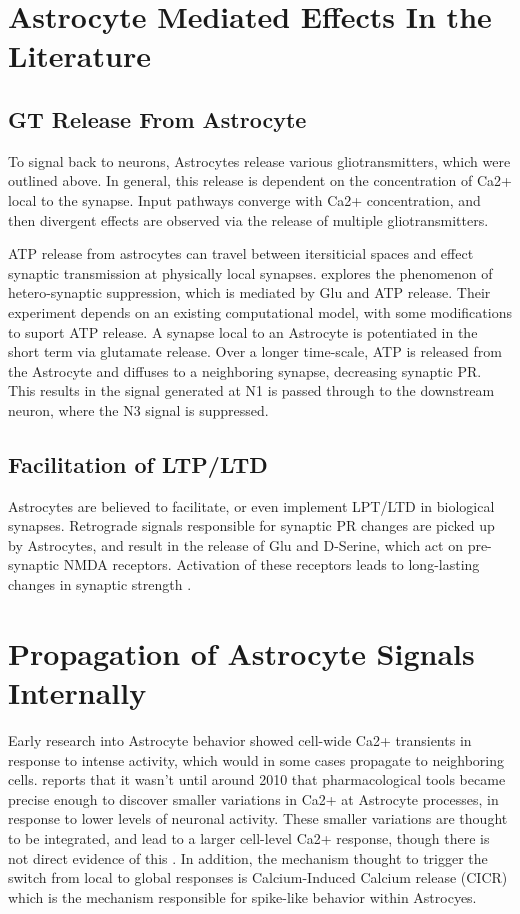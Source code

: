     \section{Astrocyte Mediated Effects In the Literature}
    \subsection{GT Release From Astrocyte}
    To signal back to neurons, Astrocytes release various gliotransmitters,
    which were outlined above. In general, this release is dependent on the
    concentration of Ca2+ local to the synapse. Input pathways converge with
    Ca2+ concentration, and then divergent effects are observed via the release
    of multiple gliotransmitters.

    ATP release from astrocytes can travel between itersiticial spaces and
    effect synaptic transmission at physically local
    synapses. \cite{postnov_2009} explores the phenomenon of hetero-synaptic
    suppression, which is mediated by Glu and ATP release. Their experiment
    depends on an existing computational model, with some modifications to
    suport ATP release. A synapse local to an Astrocyte is potentiated in the
    short term via glutamate release. Over a longer time-scale, ATP is released
    from the Astrocyte and diffuses to a neighboring synapse, decreasing
    synaptic PR. This results in the signal generated at N1 is passed through to
    the downstream neuron, where the N3 signal is suppressed.

    \subsection{Facilitation of LTP/LTD}
    Astrocytes are believed to facilitate, or even implement LPT/LTD in
    biological synapses. Retrograde signals responsible for synaptic PR changes
    are picked up by Astrocytes, and result in the release of Glu and D-Serine,
    which act on pre-synaptic NMDA receptors. Activation of these receptors
    leads to long-lasting changes in synaptic strength \cite{min_2012}.

    \section{Propagation of Astrocyte Signals Internally}
    Early research into Astrocyte behavior showed cell-wide Ca2+ transients in
    response to intense activity, which would in some cases propagate to
    neighboring cells. \cite{manninen_2018} reports that it wasn't until around
    2010 that pharmacological tools became precise enough to discover smaller
    variations in Ca2+ at Astrocyte processes, in response to lower levels of
    neuronal activity. These smaller variations are thought to be integrated,
    and lead to a larger cell-level Ca2+ response, though there is not direct
    evidence of this \cite{araque_2014}. In addition, the mechanism thought to
    trigger the switch from local to global responses is Calcium-Induced Calcium
    release (CICR) which is the mechanism responsible for spike-like behavior
    within Astrocyes.
    
